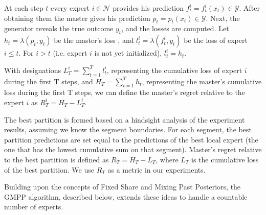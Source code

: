 \documentclass[12pt, twoside]{article}
\begin{document}
At each step $t$ every expert $i \in \mathcal{N}$ provides his prediction $f_t^i = f_t^i(x_t)  \in \mathcal{Y}$. 
After obtaining them the master gives his prediction $p_t = p_t(x_t) \in \mathcal{Y}$. 
Next, the generator reveals the true outcome $y_t$, and the losses are computed.
Let $h_t = \lambda(p_t, y_t)$ be the master's loss , and $l_t^i = \lambda(f_t^i, y_t)$ be the loss of expert $i \le t$. For $i > t$ (i.e. expert $i$ is not yet initialized), $l_t^i = h_t$.

With designations $L_T^i = \sum_{t = 1}^T l_t^i$, representing the cumulative loss of expert $i$ during the first T steps, and $H_T = \sum_{t = 1}^T h_t$, 
representing the master's cumulative loss during the first T steps, we can define the master's regret relative to the expert $i$ as $R^i_T = H_T - L^i_T$. 

The best partition is formed based on a hindsight analysis of the experiment results, assuming we know the segment boundaries. For each segment, the best partition predictions are set equal to the predictions of the best local expert (the one that has the lowest cumulative sum on that segment). Master's regret relative to the best partition is defined as $R_T= H_T - L_T$, where $L_T$ is the cumulative loss of the best partition. We use $R_T$ as a metric in our experiments.

\vspace{3mm}
 Building upon the concepts of Fixed Share and Mixing Past Posteriors, the GMPP algorithm, described below, extends these ideas to handle a countable number of experts. 
\end{document}
